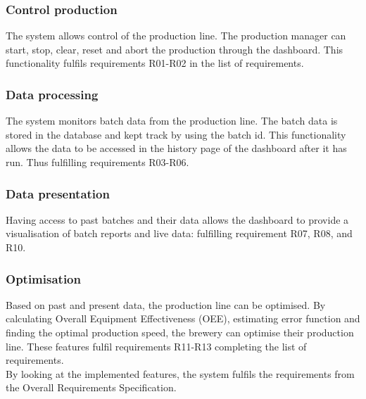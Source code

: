 \subsubsection{Control production} 
The system allows control of the production line. The production manager can
start, stop, clear, reset and abort the production through the dashboard. This
functionality fulfils requirements R01-R02 in the list of requirements.

\subsubsection{Data processing}
The system monitors batch data from the production line. The batch data is
stored in the database and kept track by using the batch id. This functionality
allows the data to be accessed in the history page of the dashboard after it has
run. Thus fulfilling requirements R03-R06.

\subsubsection{Data presentation}
Having access to past batches and their data allows the dashboard to provide a
visualisation of batch reports and live data: fulfilling requirement R07, R08,
and R10.

\subsubsection{Optimisation}
Based on past and present data, the production line can be optimised. By
calculating Overall Equipment Effectiveness (OEE), estimating error function and
finding the optimal production speed, the brewery can optimise their production
line. These features fulfil requirements R11-R13 completing the list of
requirements. \\

By looking at the implemented features, the system fulfils the requirements from
the Overall Requirements Specification.